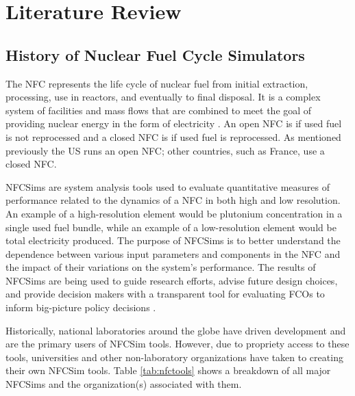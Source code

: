 \chapter{Literature Review}

\section{History of Nuclear Fuel Cycle Simulators}
The \gls{NFC} represents the life cycle of nuclear fuel from initial
extraction, processing, use in reactors, and eventually to 
final disposal.
It is a complex system of facilities and mass flows 
that are combined to meet the goal of providing nuclear energy 
in the 
form of electricity \cite{yacout_modeling_2005}.
An open \gls{NFC} is if used fuel is not reprocessed and a 
closed \gls{NFC} is if used fuel is reprocessed. 
As mentioned previously the \gls{US} runs an open 
\gls{NFC}; other countries, such as France, use a closed \gls{NFC}.

\glspl{NFCSim} are system analysis tools used to evaluate 
quantitative measures of performance related to the dynamics of 
a \gls{NFC} in both high and low resolution. 
An example of a high-resolution element would be plutonium 
concentration in a single used fuel bundle, while an example 
of a low-resolution element would be total electricity produced. 
The purpose of \glspl{NFCSim} is to better understand the 
dependence between various input parameters and components 
in the \gls{NFC} and the impact of their variations on 
the system's performance. 
The results of \glspl{NFCSim} are being used to guide research 
efforts, advise future design choices, and provide 
decision makers with a transparent tool for evaluating \glspl{FCO} 
to inform big-picture policy decisions \cite{yacout_modeling_2005}.

Historically, national laboratories around the globe have driven 
development and are the primary users of \gls{NFCSim} tools. 
However, due to propriety access to these tools, universities and 
other non-laboratory organizations have taken to creating their 
own \gls{NFCSim} tools. 
Table \ref{tab:nfctools} shows a breakdown of all major \glspl{NFCSim}
and the organization(s) associated with them.  

